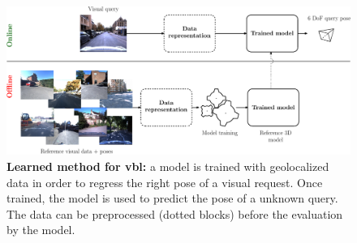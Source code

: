 \begin{figure}[t]
	\centering

	\includegraphics[width=\linewidth]{methods/learned_method}
	\caption[Learned method]{\label{fig:learned_method}\textbf{Learned method for \acs{vbl}:} a model is trained with geolocalized data in order to regress the right pose of a visual request. Once trained, the model is used to predict the pose of a unknown query. The data can be preprocessed (dotted blocks) before the evaluation by the model.}
\end{figure}
